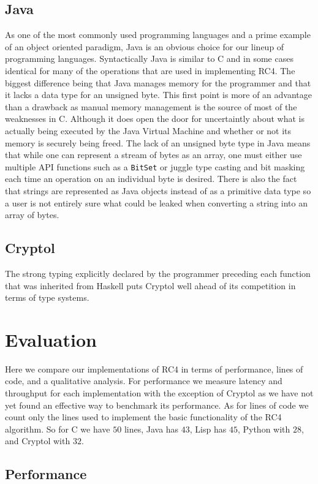 \subsection{Java}
As one of the most commonly used programming languages and a prime example of an object oriented paradigm, Java is an obvious choice for our lineup of programming languages.
Syntactically Java is similar to C and in some cases identical for many of the operations that are used in implementing RC4. The biggest difference being that Java manages 
memory for the programmer and that it lacks a data type for an unsigned byte. This first point is more of an advantage than a drawback as manual memory management is the 
source of most of the weaknesses in C. Although it does open the door for uncertaintly about what is actually being executed by the Java Virtual Machine and whether or not 
its memory is securely being freed. The lack of an unsigned byte type in Java means that while one can represent a stream of bytes as an array, one must either use multiple 
API functions such as a \texttt{BitSet} or juggle type casting and bit masking each time an operation on an individual byte is desired. There is also the fact that 
strings are represented as Java objects instead of as a primitive data type so a user is not entirely sure what could be leaked when converting a string into an array of 
bytes.

\subsection{Cryptol}
The strong typing explicitly declared by the programmer preceding each function that was inherited from Haskell puts Cryptol well ahead of its competition in terms of 
type systems.

\section{Evaluation}
Here we compare our implementations of RC4 in terms of performance, lines of code, and a qualitative analysis. For performance we measure latency and throughput for 
each implementation with the exception of Cryptol as we have not yet found an effective way to benchmark its performance. As for lines of code we count only the lines used to implement the basic functionality of the RC4 algorithm. So for C we have $50$ lines, Java has $43$, Lisp has $45$, Python with $28$, and Cryptol with $32$.

\subsection{Performance}

